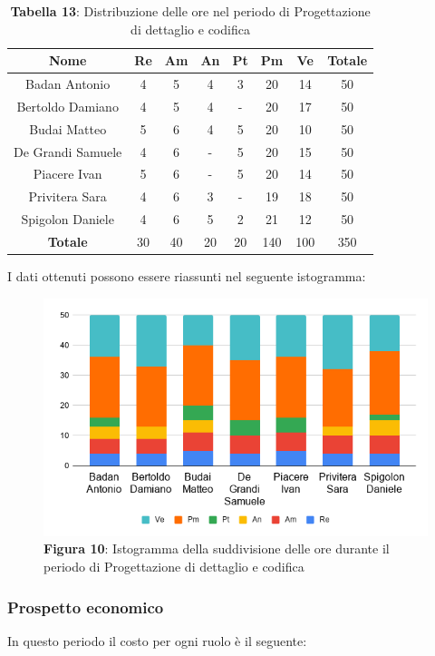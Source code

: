 \begin{table}[H]
	\centering
	\renewcommand{\arraystretch}{1.5}
	\begin{tabular}{|c|c|c|c|c|c|c|c|}
		\hline
		\rowcolor{lighter-grayer}
Nome & Re & Am & An & Pt & Pm & Ve & Totale \\ \hline
Badan Antonio & 4 & 5 & 4 & 3 & 20 & 14 & 50 \\ \hline
Bertoldo Damiano & 4 & 5 & 4 & - & 20 & 17 & 50 \\ \hline
Budai Matteo & 5 & 6 & 4 & 5 & 20 & 10 & 50 \\ \hline
De Grandi Samuele & 4 & 6 & - & 5 & 20 & 15 & 50 \\ \hline
Piacere Ivan & 5 & 6 & - & 5 & 20 & 14 & 50 \\ \hline
Privitera Sara & 4 & 6 & 3 & - & 19 & 18 & 50 \\ \hline
Spigolon Daniele & 4 & 6 & 5 & 2 & 21 & 12 & 50 \\ \hline
\textbf{Totale} & 30 & 40 & 20 & 20 & 140 & 100 & 350 \\ \hline
	\end{tabular}
	\caption*{\textbf{Tabella 13}: Distribuzione delle ore nel periodo di Progettazione di dettaglio e codifica\\}
\end{table}	
I dati ottenuti possono essere riassunti nel seguente istogramma:

\begin{figure}[H]
	\centering
	\includegraphics[width=0.7\linewidth]{res/images/IstogrammaFase3.png}
	\caption*{\textbf{Figura 10}: Istogramma della suddivisione delle ore durante il periodo di Progettazione di dettaglio e codifica}
	\label{fig:Figura10}
\end{figure}


\subsubsection{Prospetto economico}
In questo periodo il costo per ogni ruolo è il seguente:


